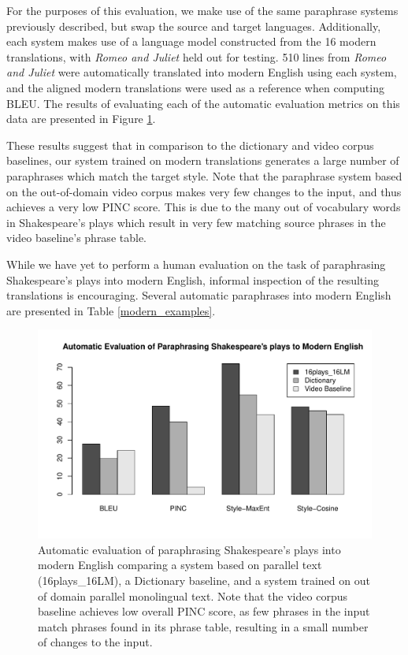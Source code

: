 \documentclass[10pt,a5paper,twoside]{article}
\begin{document}
For the purposes of this evaluation, 
we make use of the same paraphrase systems previously described, but swap the source and target languages.
Additionally, each system makes use of a language model constructed from the 16 modern translations, with {\em Romeo and Juliet} held out for testing.  
510 lines from {\em Romeo and Juliet} were automatically translated into modern English using each system, and the aligned modern 
translations were used as a reference when computing BLEU.  The results of evaluating each of the automatic evaluation metrics on this
data are presented in Figure \ref{shakespeare_to_modern_automatic}.  

These results suggest that in comparison to the dictionary and video corpus baselines, 
our system trained on modern translations generates a large number of paraphrases which match the target style.
Note that the paraphrase system 
based on the out-of-domain video corpus makes very few changes to the input, and thus achieves a very low PINC score.  This is due to the many out of
vocabulary words in Shakespeare's plays which result in very few matching source phrases in the video baseline's phrase table.

While we have yet to perform a human evaluation on the task of paraphrasing Shakespeare's plays into modern English, 
informal inspection of the resulting translations is encouraging.  Several automatic paraphrases into modern English are presented in Table \ref{modern_examples}.

\begin{figure}
  \includegraphics[width=5in]{figures/shakespeare_to_modern.pdf}
  \caption{Automatic evaluation of paraphrasing Shakespeare's plays into modern English comparing a system based on parallel text (16plays\_16LM), 
  a Dictionary baseline, and a system trained on out of domain parallel monolingual text.  Note that the video corpus baseline achieves low overall
  PINC score, as few phrases in the input match phrases found in its phrase table, resulting in a small number of changes to the input.}
  \label{shakespeare_to_modern_automatic}
\end{figure}
\end{document}
